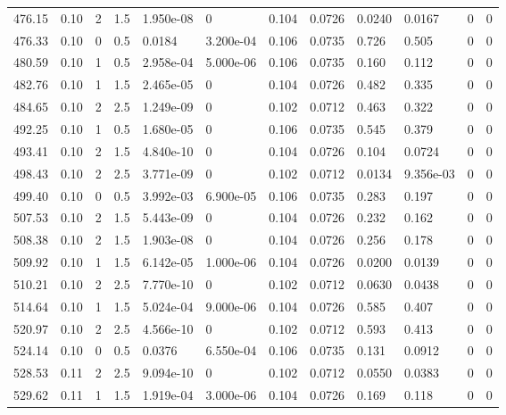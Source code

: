 \documentclass[preview]{standalone}
\begin{document}
{{{{\begin{tabular}{L{1.2cm}C{1.2cm} C{0.3cm}C{0.5cm} C{1.4cm}C{1.4cm} C{1.4cm}C{1.4cm} C{1.6cm}C{1.6cm} C{1.6cm}C{1.6cm}}
  476.15  &  0.10  & 2     & 1.5 &  1.950e-08  & 0  &  0.104&   0.0726& 0.0240 & 0.0167   &  0 & 0  \\ 
  476.33  &  0.10  & 0     & 0.5 &  0.0184  & 3.200e-04  &  0.106&   0.0735& 0.726 & 0.505   &  0 & 0  \\ 
  480.59  &  0.10  & 1     & 0.5 &  2.958e-04  & 5.000e-06  &  0.106&   0.0735& 0.160 & 0.112   &  0 & 0  \\ 
  482.76  &  0.10  & 1     & 1.5 &  2.465e-05  & 0  &  0.104&   0.0726& 0.482 & 0.335   &  0 & 0  \\ 
  484.65  &  0.10  & 2     & 2.5 &  1.249e-09  & 0  &  0.102&   0.0712& 0.463 & 0.322   &  0 & 0  \\ 
  492.25  &  0.10  & 1     & 0.5 &  1.680e-05  & 0  &  0.106&   0.0735& 0.545 & 0.379   &  0 & 0  \\ 
  493.41  &  0.10  & 2     & 1.5 &  4.840e-10  & 0  &  0.104&   0.0726& 0.104 & 0.0724   &  0 & 0  \\ 
  498.43  &  0.10  & 2     & 2.5 &  3.771e-09  & 0  &  0.102&   0.0712& 0.0134 & 9.356e-03   &  0 & 0  \\ 
  499.40  &  0.10  & 0     & 0.5 &  3.992e-03  & 6.900e-05  &  0.106&   0.0735& 0.283 & 0.197   &  0 & 0  \\ 
  507.53  &  0.10  & 2     & 1.5 &  5.443e-09  & 0  &  0.104&   0.0726& 0.232 & 0.162   &  0 & 0  \\ 
  508.38  &  0.10  & 2     & 1.5 &  1.903e-08  & 0  &  0.104&   0.0726& 0.256 & 0.178   &  0 & 0  \\ 
  509.92  &  0.10  & 1     & 1.5 &  6.142e-05  & 1.000e-06  &  0.104&   0.0726& 0.0200 & 0.0139   &  0 & 0  \\ 
  510.21  &  0.10  & 2     & 2.5 &  7.770e-10  & 0  &  0.102&   0.0712& 0.0630 & 0.0438   &  0 & 0  \\ 
  514.64  &  0.10  & 1     & 1.5 &  5.024e-04  & 9.000e-06  &  0.104&   0.0726& 0.585 & 0.407   &  0 & 0  \\ 
  520.97  &  0.10  & 2     & 2.5 &  4.566e-10  & 0  &  0.102&   0.0712& 0.593 & 0.413   &  0 & 0  \\ 
  524.14  &  0.10  & 0     & 0.5 &  0.0376  & 6.550e-04  &  0.106&   0.0735& 0.131 & 0.0912   &  0 & 0  \\ 
  528.53  &  0.11  & 2     & 2.5 &  9.094e-10  & 0  &  0.102&   0.0712& 0.0550 & 0.0383   &  0 & 0  \\ 
  529.62  &  0.11  & 1     & 1.5 &  1.919e-04  & 3.000e-06  &  0.104&   0.0726& 0.169 & 0.118   &  0 & 0  \\ 

\end{tabular}}}}}
\end{document}
